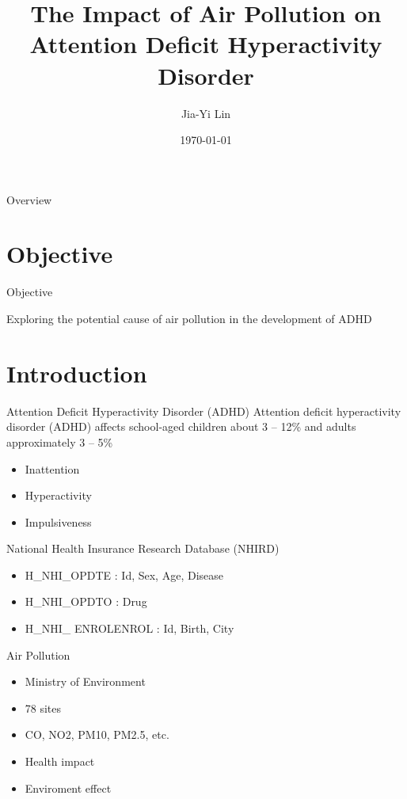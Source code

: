 \documentclass[aspectratio=169,xcolor=dvipsnames]{beamer}
\title[short title]{The Impact of Air Pollution on Attention Deficit Hyperactivity Disorder}
\author[Jia-Yi] {Jia-Yi Lin}
\institute[NDHU] %
{
	Department of Applied Mathematics \\
	National Dong Hwa University 
	\vskip 3pt
}
\date{\today} %
\begin{document}
	
	\begin{frame}
		\titlepage
	\end{frame}
	
	\begin{frame}{Overview}
		
		\tableofcontents
	\end{frame}
	\section{Objective}
	\begin{frame}{Objective}
		\begin{Center}
			Exploring the potential cause of air pollution in the development of ADHD
		\end{Center}
		
	\end{frame}
	\section{Introduction}
	\begin{frame}{Attention Deficit Hyperactivity Disorder (ADHD)}
		Attention deficit hyperactivity disorder (ADHD) affects school-aged children about 3 – 12\% and adults approximately 3 – 5\% 		
		\begin{itemize}
			\item Inattention
			\item Hyperactivity
			\item Impulsiveness
		\end{itemize}
		
	\end{frame}
	\begin{frame}{National Health Insurance Research Database (NHIRD)}
		
		\begin{itemize}
			\item H\_NHI\_OPDTE : Id, Sex, Age, Disease
			\item H\_NHI\_OPDTO : Drug
			\item H\_NHI\_ ENROLENROL : Id, Birth, City
		\end{itemize}
	\end{frame}
	\begin{frame}{Air Pollution}
		\begin{itemize}
			\item Ministry of Environment
			\item 78 sites
			\item CO, NO2, PM10, PM2.5, etc.
			\item Health impact
			\item Enviroment effect
		\end{itemize}
	\end{frame}
\end{document}
